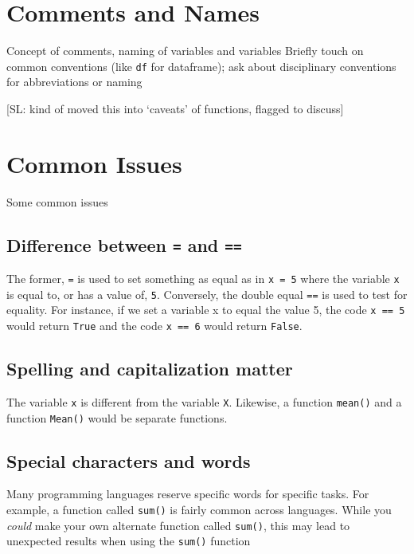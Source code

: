 \documentclass[
]{book}
\begin{document}
\chapter{Comments and Names}\label{comments-and-names}

Concept of comments, naming of variables and variables
Briefly touch on common conventions (like \texttt{df} for dataframe); ask about disciplinary conventions for abbreviations or naming

{[}SL: kind of moved this into `caveats' of functions, flagged to discuss{]}

\chapter{Common Issues}\label{common-issues}

Some common issues

\section{\texorpdfstring{Difference between \texttt{=} and \texttt{==}}{Difference between = and ==}}\label{difference-between-and}

The former, \texttt{=} is used to set something as equal as in \texttt{x\ =\ 5} where
the variable \texttt{x} is equal to, or has a value of, \texttt{5}. Conversely, the
double equal \texttt{==} is used to test for equality. For instance, if we set
a variable x to equal the value 5, the code \texttt{x\ ==\ 5} would return \texttt{True}
and the code \texttt{x\ ==\ 6} would return \texttt{False}.\\

\section{Spelling and capitalization matter}\label{spelling-and-capitalization-matter}

The variable \texttt{x} is different from the variable \texttt{X}. Likewise, a
function \texttt{mean()} and a function \texttt{Mean()} would be separate functions.

\section{Special characters and words}\label{special-characters-and-words}

Many programming languages reserve specific words for specific tasks.
For example, a function called \texttt{sum()} is fairly common across
languages. While you \emph{could} make your own alternate function called
\texttt{sum()}, this may lead to unexpected results when using the \texttt{sum()}
function\\
\end{document}
